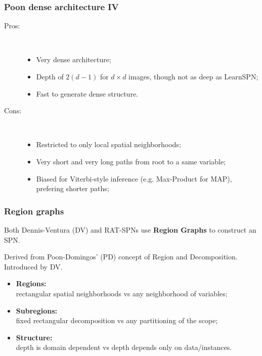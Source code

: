 \documentclass[usenames,dvipsnames]{beamer}
\begin{document}
\begin{frame}
  \frametitle{Poon dense architecture IV}

  \begin{description}
    \item[Pros:]~\\
      \begin{itemize}
        \item Very dense architecture;
        \item Depth of $2(d-1)$ for $d\times d$ images, though not as deep as LearnSPN;
        \item Fast to generate dense structure.
      \end{itemize}
    \item[Cons:]~\\
      \begin{itemize}
        \item Restricted to only local spatial neighborhoods;
        \item Very short and very long paths from root to a same variable;
        \item Biased for Viterbi-style inference (e.g. Max-Product for MAP), prefering shorter
          paths;
      \end{itemize}
  \end{description}
\end{frame}

\begin{frame}
  \frametitle{Region graphs}

  Both \textcolor{YellowOrange}{Dennis-Ventura (DV)} and RAT-SPNs use \textbf{Region Graphs} to
  construct an SPN.

  Derived from \textcolor{OliveGreen}{Poon-Domingos' (PD)} concept of Region and Decomposition.
  Introduced by DV.

  \begin{itemize}
    \item \textbf{Regions:}\\
      \textcolor{OliveGreen}{rectangular spatial neighborhoods} vs \textcolor{YellowOrange}{any
      neighborhood of variables};
    \item \textbf{Subregions:}\\
      \textcolor{OliveGreen}{fixed rectangular decomposition} vs \textcolor{YellowOrange}{any
      partitioning of the scope};
    \item \textbf{Structure:}\\
      \textcolor{OliveGreen}{depth is domain dependent} vs \textcolor{YellowOrange}{depth depends
      only on data/instances}.
  \end{itemize}
\end{frame}
\end{document}
